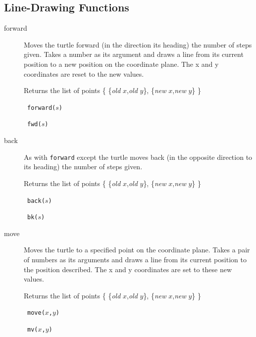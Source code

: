 \subsection{Line-Drawing Functions}
\begin{description}
 \item[forward] Moves the turtle forward (in the direction its heading)
       the number of steps given. Takes a number as its argument and draws
       a line from its current position to a new position on the
       coordinate plane. The x and y coordinates are reset to the new
       values.

       Returns the list of points  
    \{ \{{\it old} $x$,{\it old} $y$\}, \{{\it new} $x$,{\it new} $y$\} \}

       \syntax\ {\tt forward($s$)}
 
       \abb\ {\tt fwd($s$)}
 \item[back] As with {\tt forward} except the turtle moves back (in the
       opposite direction to its heading) the number of steps given.

       Returns the list of points
    \{ \{{\it old} $x$,{\it old} $y$\}, \{{\it new} $x$,{\it new} $y$\} \}

       \syntax\ {\tt back($s$)}

       \abb\ {\tt bk($s$)}
 \item[move] Moves the turtle to a specified point on the coordinate
       plane. Takes a pair of numbers as its arguments and draws a line
       from its current position to the position described. The x and y
       coordinates are set to these new values.

       Returns the list of points 
    \{ \{{\it old} $x$,{\it old} $y$\}, \{{\it new} $x$,{\it new} $y$\} \}

       \syntax\ {\tt move($x$,$y$)}

       \abb\ {\tt mv($x$,$y$)}
\end{description}

